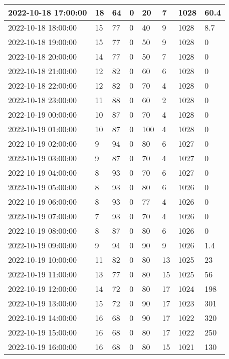 \begin{longtable}{|l|l|l|l|l|l|l|l|}
        2022-10-18 17:00:00 & 18 & 64 & 0 & 20 & 7 & 1028 & 60.4 \\ \hline
        2022-10-18 18:00:00 & 15 & 77 & 0 & 40 & 9 & 1028 & 8.7 \\ \hline
        2022-10-18 19:00:00 & 15 & 77 & 0 & 50 & 9 & 1028 & 0 \\ \hline
        2022-10-18 20:00:00 & 14 & 77 & 0 & 50 & 7 & 1028 & 0 \\ \hline
        2022-10-18 21:00:00 & 12 & 82 & 0 & 60 & 6 & 1028 & 0 \\ \hline
        2022-10-18 22:00:00 & 12 & 82 & 0 & 70 & 4 & 1028 & 0 \\ \hline
        2022-10-18 23:00:00 & 11 & 88 & 0 & 60 & 2 & 1028 & 0 \\ \hline
        2022-10-19 00:00:00 & 10 & 87 & 0 & 70 & 4 & 1028 & 0 \\ \hline
        2022-10-19 01:00:00 & 10 & 87 & 0 & 100 & 4 & 1028 & 0 \\ \hline
        2022-10-19 02:00:00 & 9 & 94 & 0 & 80 & 6 & 1027 & 0 \\ \hline
        2022-10-19 03:00:00 & 9 & 87 & 0 & 70 & 4 & 1027 & 0 \\ \hline
        2022-10-19 04:00:00 & 8 & 93 & 0 & 70 & 6 & 1027 & 0 \\ \hline
        2022-10-19 05:00:00 & 8 & 93 & 0 & 80 & 6 & 1026 & 0 \\ \hline
        2022-10-19 06:00:00 & 8 & 93 & 0 & 77 & 4 & 1026 & 0 \\ \hline
        2022-10-19 07:00:00 & 7 & 93 & 0 & 70 & 4 & 1026 & 0 \\ \hline
        2022-10-19 08:00:00 & 8 & 87 & 0 & 80 & 6 & 1026 & 0 \\ \hline
        2022-10-19 09:00:00 & 9 & 94 & 0 & 90 & 9 & 1026 & 1.4 \\ \hline
        2022-10-19 10:00:00 & 11 & 82 & 0 & 80 & 13 & 1025 & 23 \\ \hline
        2022-10-19 11:00:00 & 13 & 77 & 0 & 80 & 15 & 1025 & 56 \\ \hline
        2022-10-19 12:00:00 & 14 & 72 & 0 & 80 & 17 & 1024 & 198 \\ \hline
        2022-10-19 13:00:00 & 15 & 72 & 0 & 90 & 17 & 1023 & 301 \\ \hline
        2022-10-19 14:00:00 & 16 & 68 & 0 & 90 & 17 & 1022 & 320 \\ \hline
        2022-10-19 15:00:00 & 16 & 68 & 0 & 80 & 17 & 1022 & 250 \\ \hline
        2022-10-19 16:00:00 & 16 & 68 & 0 & 80 & 15 & 1021 & 130 \\ \hline

\end{longtable}
